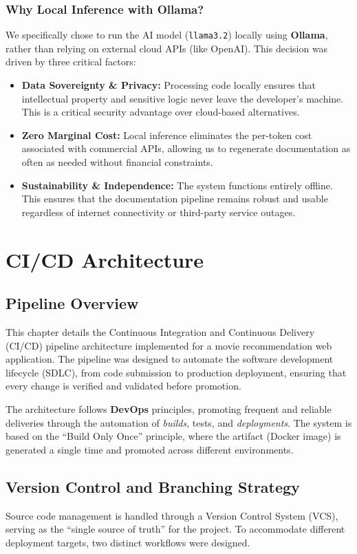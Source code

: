 \documentclass[a4paper,12pt]{report}
\begin{document}
\subsection{Why Local Inference with Ollama?}
We specifically chose to run the AI model (\texttt{llama3.2}) locally using \textbf{Ollama}, rather than relying on external cloud APIs (like OpenAI). This decision was driven by three critical factors:
\begin{itemize}
    \item \textbf{Data Sovereignty \& Privacy:} Processing code locally ensures that intellectual property and sensitive logic never leave the developer's machine. This is a critical security advantage over cloud-based alternatives.
    \item \textbf{Zero Marginal Cost:} Local inference eliminates the per-token cost associated with commercial APIs, allowing us to regenerate documentation as often as needed without financial constraints.
    \item \textbf{Sustainability \& Independence:} The system functions entirely offline. This ensures that the documentation pipeline remains robust and usable regardless of internet connectivity or third-party service outages.
\end{itemize}

\chapter{CI/CD Architecture}
  \section{Pipeline Overview}
    This chapter details the Continuous Integration and Continuous Delivery (CI/CD) pipeline architecture implemented for a movie recommendation web application. The pipeline was designed to automate the software development lifecycle (SDLC), from code submission to production deployment, ensuring that every change is verified and validated before promotion.

    The architecture follows \textbf{DevOps} principles, promoting frequent and reliable deliveries through the automation of \textit{builds}, tests, and \textit{deployments}. The system is based on the ``Build Only Once'' principle, where the artifact (Docker image) is generated a single time and promoted across different environments.

  \section{Version Control and Branching Strategy}
    Source code management is handled through a Version Control System (VCS), serving as the ``single source of truth'' for the project. To accommodate different deployment targets, two distinct workflows were designed.
\end{document}
